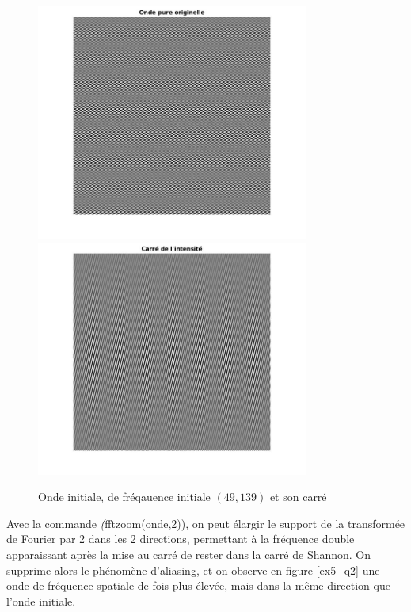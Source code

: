 \documentclass[12pt,a4paper,onecolumn]{article}
\begin{document}
\begin{figure}[H]
	\begin{center}
		\includegraphics[width = 0.8\textwidth]{ex5_onde.jpg}
		\includegraphics[width = 0.8\textwidth]{ex5_onde_square.jpg}
	\end{center}
	\caption{Onde initiale, de fréqauence initiale $(49, 139)$ et son carré}
	\label{ex5_q1}
\end{figure}

Avec la commande \textit(fftzoom(onde,2)), on peut élargir le support de la transformée de Fourier par 2 dans les 2 directions, permettant à la fréquence double apparaissant après la mise au carré de rester dans la carré de Shannon. On supprime alors le phénomène d'aliasing, et on observe en figure \ref{ex5_q2} une onde de fréquence spatiale de fois plus élevée, mais dans la même direction que l'onde initiale.
\end{document}
